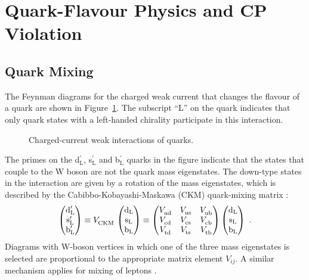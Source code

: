 \section{Quark-Flavour Physics and CP Violation}
\label{sec:intro_CPV}

\subsection{Quark Mixing}
\label{subsec:intro_mixCPV_mix}

The Feynman diagrams for the charged weak current that changes the flavour of a quark are shown in Figure~\ref{fig:WCouplings}. The
subscript ``L'' on the quark indicates that only quark states with a left-handed chirality participate in this interaction.
\begin{figure}[hbt]
  {\sffamily }
  \caption{Charged-current weak interactions of quarks.}
  \label{fig:WCouplings}
\end{figure}

The primes on the d$_\text{L}^\prime$, s$_\text{L}^\prime$ and b$_\text{L}^\prime$ quarks in the figure indicate that the states that
couple to the W boson are not the quark mass eigenstates. The down-type states in the interaction are given by a rotation of the mass
eigenstates, which is described by the Cabibbo-Kobayashi-Maskawa (CKM) quark-mixing matrix \cite{Kobayashi:1973fv}:
\begin{equation}
  \begin{pmatrix} \text{d}_\text{L}^\prime \\ \text{s}_\text{L}^\prime \\ \text{b}_\text{L}^\prime \end{pmatrix}
    \equiv \VCKM\, \begin{pmatrix} \text{d}_\text{L} \\ \text{s}_\text{L} \\ \text{b}_\text{L} \end{pmatrix}
    \equiv \begin{pmatrix} \Vud & \Vus & \Vub \\ \Vcd & \Vcs & \Vcb \\ \Vtd & \Vts & \Vtb \end{pmatrix}
           \begin{pmatrix} \text{d}_\text{L} \\ \text{s}_\text{L} \\ \text{b}_\text{L} \end{pmatrix}
    \ .
\end{equation}
Diagrams with W-boson vertices in which one of the three mass eigenstates is selected are proportional to the appropriate matrix element
$V_{ij}$. A similar mechanism applies for mixing of leptons \cite{Pontecorvo:1957cp,*Pontecorvo:1957qd,*Maki:1962mu,*Pontecorvo:1967fh}.

